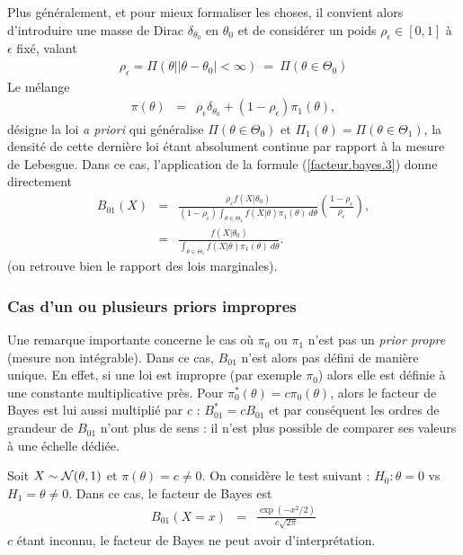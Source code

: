 Plus généralement, et pour mieux formaliser les choses, il convient alors d'introduire une masse de Dirac $\delta_{\theta_0}$ en $\theta_0$ et de considérer un poids $\rho_{\epsilon}\in[0,1]$ à $\epsilon$ fixé, valant \begin{eqnarray*}
\rho_{\epsilon} = \Pi(\theta | |\theta-\theta_0|<\infty) \ = \ \Pi(\theta\in\Theta_0)
\end{eqnarray*}
Le mélange
\begin{eqnarray*}
\pi(\theta) & = & \rho_{\epsilon}\delta_{\theta_0} + (1-\rho_{\epsilon})\pi_1(\theta),
\end{eqnarray*}
désigne la loi {\it a priori} qui généralise $\Pi(\theta\in\Theta_0)$ et $\Pi_1(\theta)=\Pi(\theta\in\Theta_1)$, la densité de cette dernière loi étant absolument continue par rapport à la mesure de Lebesgue.
Dans ce cas, l'application de la formule (\ref{facteur.bayes.3}) donne directement 
\begin{eqnarray*}
B_{01}(X) & = & \frac{\rho_{\epsilon} f(X|\theta_0)}{(1-\rho_{\epsilon})\int_{\theta\in\Theta_1} f(X|\theta) \pi_1(\theta) \ d\theta} \left( \frac{1-\rho_{\epsilon}}{\rho_{\epsilon}}\right), \\
& = & \frac{f(X|\theta_0)}{\int_{\theta\in\Theta_1} f(X|\theta) \pi_1(\theta) \ d\theta}. 
\end{eqnarray*}
(on retrouve bien le rapport des lois marginales). 


\subsubsection*{Cas d'un ou plusieurs priors impropres}\label{priors.impropres.choix}

Une remarque importante concerne le cas où $\pi_0$ ou $\pi_1$ n’est pas un \emph{prior propre} (mesure non intégrable). Dans ce cas, $B_{01}$ n’est alors pas défini de manière unique. En effet, si une loi est impropre (par exemple $\pi_0$) alors elle est définie à une constante multiplicative
près. Pour $\pi^*_0(\theta) = c \pi_0(\theta)$, alors le facteur de Bayes est lui aussi multiplié
par $c$ : $B^*_{01} = c B_{01}$ et par conséquent les ordres de grandeur de $B_{01}$ n’ont 
plus de sens : il n’est plus possible de comparer ses valeurs à une échelle dédiée. \\

\begin{exo}
Soit $X\sim{\cal{N}}(\theta,1)$ et $\pi(\theta)=c\neq 0$. On considère le test suivant : $H_0:\theta=0$ vs $H_1=\theta\neq 0$. Dans ce cas, le facteur de Bayes est
\begin{eqnarray*}
B_{01}(X=x) & = & \frac{\exp(-x^2/2)}{c\sqrt{2\pi}}
\end{eqnarray*}
$c$ étant inconnu, le facteur de Bayes ne peut avoir d'interprétation. \\
\end{exo}

